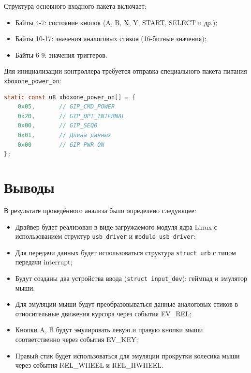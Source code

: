 Структура основного входного пакета включает:
\begin{itemize}[label=---]
    \item Байты 4-7: состояние кнопок (A, B, X, Y, START, SELECT и др.);
    \item Байты 10-17: значения аналоговых стиков (16-битные значения);
    \item Байты 6-9: значения триггеров.
\end{itemize}

Для инициализации контроллера требуется отправка специального пакета питания \texttt{xboxone\_power\_on}:

\begin{lstlisting}[label=lst:power_on,caption=Пакет инициализации Xbox Series S,language=c]
static const u8 xboxone_power_on[] = {
    0x05,       // GIP_CMD_POWER
    0x20,       // GIP_OPT_INTERNAL
    0x00,       // GIP_SEQ0
    0x01,       // Длина данных
    0x00        // GIP_PWR_ON
};
\end{lstlisting}

\section{Выводы}

В результате проведённого анализа было определено следующее:
\begin{itemize}[label=---]
	\item Драйвер будет реализован в виде загружаемого модуля ядра Linux с использованием структур \texttt{usb\_driver} и \texttt{module\_usb\_driver};
	\item Для передачи данных будет использоваться структура \texttt{struct urb} с типом передачи interrupt;
	\item Будут созданы два устройства ввода (\texttt{struct input\_dev}): геймпад и эмулятор мыши;
	\item Для эмуляции мыши будут преобразовываться данные аналоговых стиков в относительные движения курсора через события EV\_REL;
	\item Кнопки A, B будут эмулировать левую и правую кнопки мыши соответственно через события EV\_KEY;
	\item Правый стик будет использоваться для эмуляции прокрутки колесика мыши через события REL\_WHEEL и REL\_HWHEEL.
\end{itemize}